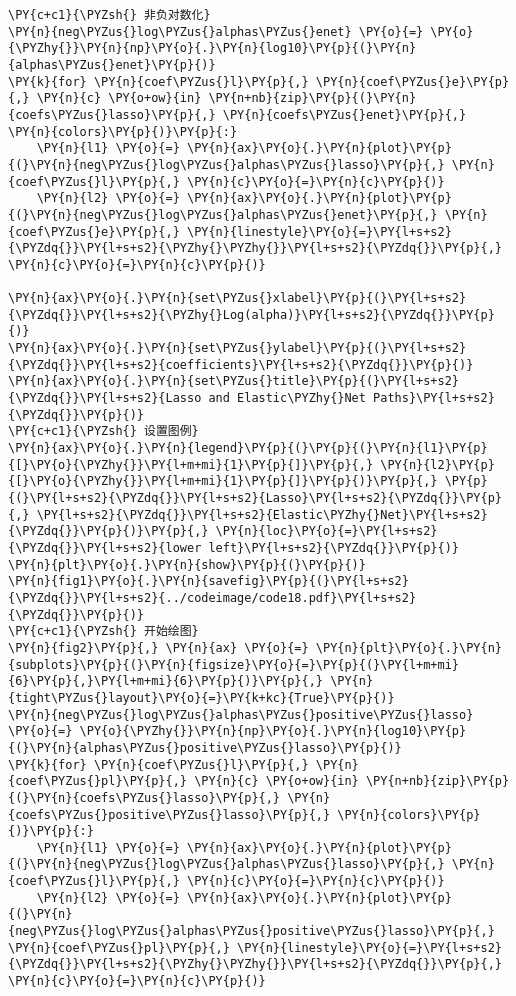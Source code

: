 \begin{Verbatim}[commandchars=\\\{\}]
\PY{c+c1}{\PYZsh{} 非负对数化}
\PY{n}{neg\PYZus{}log\PYZus{}alphas\PYZus{}enet} \PY{o}{=} \PY{o}{\PYZhy{}}\PY{n}{np}\PY{o}{.}\PY{n}{log10}\PY{p}{(}\PY{n}{alphas\PYZus{}enet}\PY{p}{)}
\PY{k}{for} \PY{n}{coef\PYZus{}l}\PY{p}{,} \PY{n}{coef\PYZus{}e}\PY{p}{,} \PY{n}{c} \PY{o+ow}{in} \PY{n+nb}{zip}\PY{p}{(}\PY{n}{coefs\PYZus{}lasso}\PY{p}{,} \PY{n}{coefs\PYZus{}enet}\PY{p}{,} \PY{n}{colors}\PY{p}{)}\PY{p}{:}
    \PY{n}{l1} \PY{o}{=} \PY{n}{ax}\PY{o}{.}\PY{n}{plot}\PY{p}{(}\PY{n}{neg\PYZus{}log\PYZus{}alphas\PYZus{}lasso}\PY{p}{,} \PY{n}{coef\PYZus{}l}\PY{p}{,} \PY{n}{c}\PY{o}{=}\PY{n}{c}\PY{p}{)}
    \PY{n}{l2} \PY{o}{=} \PY{n}{ax}\PY{o}{.}\PY{n}{plot}\PY{p}{(}\PY{n}{neg\PYZus{}log\PYZus{}alphas\PYZus{}enet}\PY{p}{,} \PY{n}{coef\PYZus{}e}\PY{p}{,} \PY{n}{linestyle}\PY{o}{=}\PY{l+s+s2}{\PYZdq{}}\PY{l+s+s2}{\PYZhy{}\PYZhy{}}\PY{l+s+s2}{\PYZdq{}}\PY{p}{,} \PY{n}{c}\PY{o}{=}\PY{n}{c}\PY{p}{)}

\PY{n}{ax}\PY{o}{.}\PY{n}{set\PYZus{}xlabel}\PY{p}{(}\PY{l+s+s2}{\PYZdq{}}\PY{l+s+s2}{\PYZhy{}Log(alpha)}\PY{l+s+s2}{\PYZdq{}}\PY{p}{)}
\PY{n}{ax}\PY{o}{.}\PY{n}{set\PYZus{}ylabel}\PY{p}{(}\PY{l+s+s2}{\PYZdq{}}\PY{l+s+s2}{coefficients}\PY{l+s+s2}{\PYZdq{}}\PY{p}{)}
\PY{n}{ax}\PY{o}{.}\PY{n}{set\PYZus{}title}\PY{p}{(}\PY{l+s+s2}{\PYZdq{}}\PY{l+s+s2}{Lasso and Elastic\PYZhy{}Net Paths}\PY{l+s+s2}{\PYZdq{}}\PY{p}{)}
\PY{c+c1}{\PYZsh{} 设置图例}
\PY{n}{ax}\PY{o}{.}\PY{n}{legend}\PY{p}{(}\PY{p}{(}\PY{n}{l1}\PY{p}{[}\PY{o}{\PYZhy{}}\PY{l+m+mi}{1}\PY{p}{]}\PY{p}{,} \PY{n}{l2}\PY{p}{[}\PY{o}{\PYZhy{}}\PY{l+m+mi}{1}\PY{p}{]}\PY{p}{)}\PY{p}{,} \PY{p}{(}\PY{l+s+s2}{\PYZdq{}}\PY{l+s+s2}{Lasso}\PY{l+s+s2}{\PYZdq{}}\PY{p}{,} \PY{l+s+s2}{\PYZdq{}}\PY{l+s+s2}{Elastic\PYZhy{}Net}\PY{l+s+s2}{\PYZdq{}}\PY{p}{)}\PY{p}{,} \PY{n}{loc}\PY{o}{=}\PY{l+s+s2}{\PYZdq{}}\PY{l+s+s2}{lower left}\PY{l+s+s2}{\PYZdq{}}\PY{p}{)}
\PY{n}{plt}\PY{o}{.}\PY{n}{show}\PY{p}{(}\PY{p}{)}
\PY{n}{fig1}\PY{o}{.}\PY{n}{savefig}\PY{p}{(}\PY{l+s+s2}{\PYZdq{}}\PY{l+s+s2}{../codeimage/code18.pdf}\PY{l+s+s2}{\PYZdq{}}\PY{p}{)}
\PY{c+c1}{\PYZsh{} 开始绘图}
\PY{n}{fig2}\PY{p}{,} \PY{n}{ax} \PY{o}{=} \PY{n}{plt}\PY{o}{.}\PY{n}{subplots}\PY{p}{(}\PY{n}{figsize}\PY{o}{=}\PY{p}{(}\PY{l+m+mi}{6}\PY{p}{,}\PY{l+m+mi}{6}\PY{p}{)}\PY{p}{,} \PY{n}{tight\PYZus{}layout}\PY{o}{=}\PY{k+kc}{True}\PY{p}{)}
\PY{n}{neg\PYZus{}log\PYZus{}alphas\PYZus{}positive\PYZus{}lasso} \PY{o}{=} \PY{o}{\PYZhy{}}\PY{n}{np}\PY{o}{.}\PY{n}{log10}\PY{p}{(}\PY{n}{alphas\PYZus{}positive\PYZus{}lasso}\PY{p}{)}
\PY{k}{for} \PY{n}{coef\PYZus{}l}\PY{p}{,} \PY{n}{coef\PYZus{}pl}\PY{p}{,} \PY{n}{c} \PY{o+ow}{in} \PY{n+nb}{zip}\PY{p}{(}\PY{n}{coefs\PYZus{}lasso}\PY{p}{,} \PY{n}{coefs\PYZus{}positive\PYZus{}lasso}\PY{p}{,} \PY{n}{colors}\PY{p}{)}\PY{p}{:}
    \PY{n}{l1} \PY{o}{=} \PY{n}{ax}\PY{o}{.}\PY{n}{plot}\PY{p}{(}\PY{n}{neg\PYZus{}log\PYZus{}alphas\PYZus{}lasso}\PY{p}{,} \PY{n}{coef\PYZus{}l}\PY{p}{,} \PY{n}{c}\PY{o}{=}\PY{n}{c}\PY{p}{)}
    \PY{n}{l2} \PY{o}{=} \PY{n}{ax}\PY{o}{.}\PY{n}{plot}\PY{p}{(}\PY{n}{neg\PYZus{}log\PYZus{}alphas\PYZus{}positive\PYZus{}lasso}\PY{p}{,} \PY{n}{coef\PYZus{}pl}\PY{p}{,} \PY{n}{linestyle}\PY{o}{=}\PY{l+s+s2}{\PYZdq{}}\PY{l+s+s2}{\PYZhy{}\PYZhy{}}\PY{l+s+s2}{\PYZdq{}}\PY{p}{,} \PY{n}{c}\PY{o}{=}\PY{n}{c}\PY{p}{)}


\end{Verbatim}
